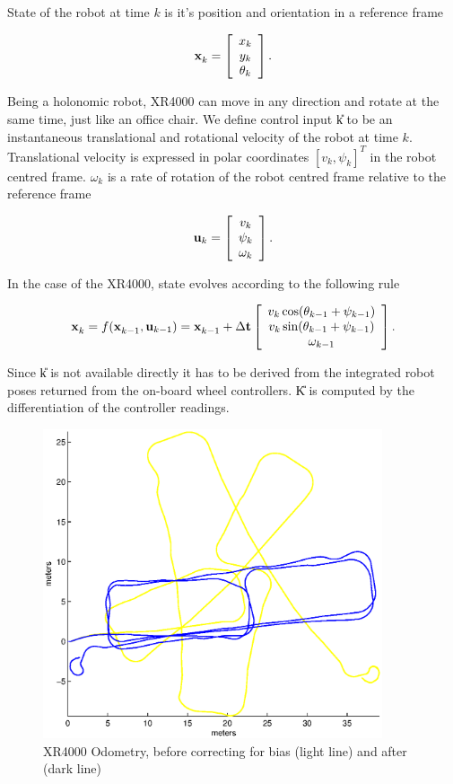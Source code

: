 State of the robot at time $k$ is it's position and orientation in a
reference frame

$$
\x{k}{}{} = \left[\begin{array}{c} 
    x_k \\ 
    y_k \\ 
    \theta_k
  \end{array}\right].
$$

Being a holonomic robot, XR4000 can move in any direction and rotate
at the same time, just like an office chair. We define control input
\U{k} to be an instantaneous translational and rotational velocity of
the robot at time $k$. Translational velocity is expressed in polar
coordinates $[v_k,\psi_k]^T$ in the robot centred frame. $\omega_k$ is
a rate of rotation of the robot centred frame relative to the
reference frame

$$
{\bf u}_{k} = \left[\begin{array}{c} v_k\\ \psi_k \\ \omega_k \end{array} \right].
$$

In the case of the XR4000, state evolves according to the following
rule

$$
\x{k}{}{} = f(\x{k-1}{}{} ,\U{k-1}) = \x{k-1}{}{} + \Delta {\bf t}
\Vector{v_k\cos(\theta_{k-1} + \psi_{k-1})\\
v_k\sin(\theta_{k-1} + \psi_{k-1})\\
\omega_{k-1}}.
$$

Since \U{k} is not available directly it has to be derived from the
integrated robot poses returned from the on-board wheel controllers.
\U{K} is computed by the differentiation of the controller readings.

\begin{figure}[htbp]
  \centering

  \includegraphics[width=10cm]{Pics/xr4000_raw_odo}
  
  \caption{XR4000 Odometry, before correcting for bias (light line)
    and after (dark line)}
  \label{fig:xr4000_raw_odo}
\end{figure}

